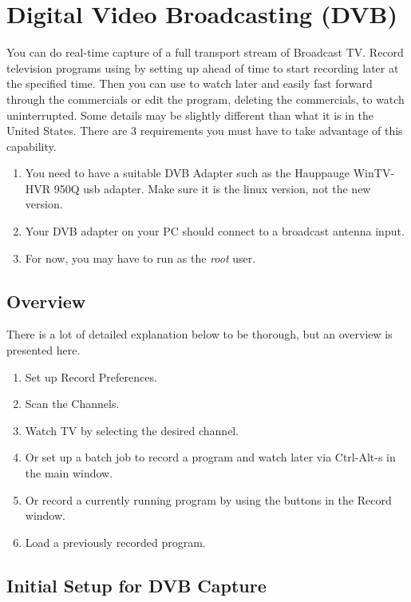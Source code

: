 \section{Digital Video Broadcasting (DVB)}%
\label{sec:digital_video_broadcasting}

You can do real-time capture of a full transport stream of Broadcast TV.  Record television programs using \CGG{} by setting up ahead of time to start recording later at the specified time.  Then you can use \CGG{} to watch later and easily fast forward through the commercials or edit the program, deleting the commercials, to watch uninterrupted.  Some details may be slightly different than what it is in the United States.  There are 3 requirements you must have to take advantage of this capability.

\begin{enumerate}
    \item You need to have a suitable DVB Adapter such as the Hauppauge WinTV-HVR 950Q usb adapter. Make sure it is the linux version, not the new version.
    \item Your DVB adapter on your PC should connect to a broadcast antenna input.
    \item For now, you may have to run as the \textit{root} user.
\end{enumerate}

\subsection{Overview}%
\label{sub:overview}

There is a lot of detailed explanation below to be thorough, but an overview is presented here.

\begin{enumerate}
    \item Set up Record Preferences.
    \item Scan the Channels.
    \item Watch TV by selecting the desired channel.
    \item Or set up a batch job to record a program and watch later via Ctrl-Alt-s in the main window.
    \item Or record a currently running program by using the buttons in the Record window.
    \item Load a previously recorded program.
\end{enumerate}

\subsection{Initial Setup for DVB Capture}%
\label{sub:initial_setup_dvb_capture}


